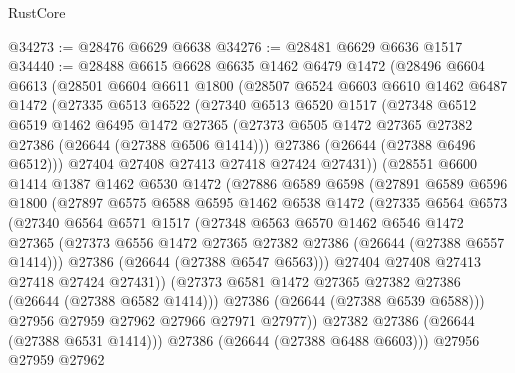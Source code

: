 \begin{lexlean}{RustCore}
\begin{coremodule}
@34273 := @28476 @6629 @6638
@34276 := @28481 @6629 @6636 @1517
@34440 := @28488
    @6615
    @6628
    @6635
    @1462
    @6479
    @1472
    (@28496
      @6604
      @6613
      (@28501
        @6604
        @6611
        @1800
        (@28507
          @6524
          @6603
          @6610
          @1462
          @6487
          @1472
          (@27335
            @6513
            @6522
            (@27340
              @6513
              @6520
              @1517
              (@27348
                @6512
                @6519
                @1462
                @6495
                @1472
                @27365
                (@27373 @6505 @1472 @27365 @27382 @27386 (@26644 (@27388 @6506 @1414)))
                @27386
                (@26644 (@27388 @6496 @6512)))
              @27404
              @27408
              @27413
              @27418
              @27424
              @27431))
          (@28551
            @6600
            @1414
            @1387
            @1462
            @6530
            @1472
            (@27886
              @6589
              @6598
              (@27891
                @6589
                @6596
                @1800
                (@27897
                  @6575
                  @6588
                  @6595
                  @1462
                  @6538
                  @1472
                  (@27335
                    @6564
                    @6573
                    (@27340
                      @6564
                      @6571
                      @1517
                      (@27348
                        @6563
                        @6570
                        @1462
                        @6546
                        @1472
                        @27365
                        (@27373 @6556 @1472 @27365 @27382 @27386 (@26644 (@27388 @6557 @1414)))
                        @27386
                        (@26644 (@27388 @6547 @6563)))
                      @27404
                      @27408
                      @27413
                      @27418
                      @27424
                      @27431))
                  (@27373 @6581 @1472 @27365 @27382 @27386 (@26644 (@27388 @6582 @1414)))
                  @27386
                  (@26644 (@27388 @6539 @6588)))
                @27956
                @27959
                @27962
                @27966
                @27971
                @27977))
            @27382
            @27386
            (@26644 (@27388 @6531 @1414)))
          @27386
          (@26644 (@27388 @6488 @6603)))
        @27956
        @27959
        @27962

\end{coremodule}
\end{lexlean}
